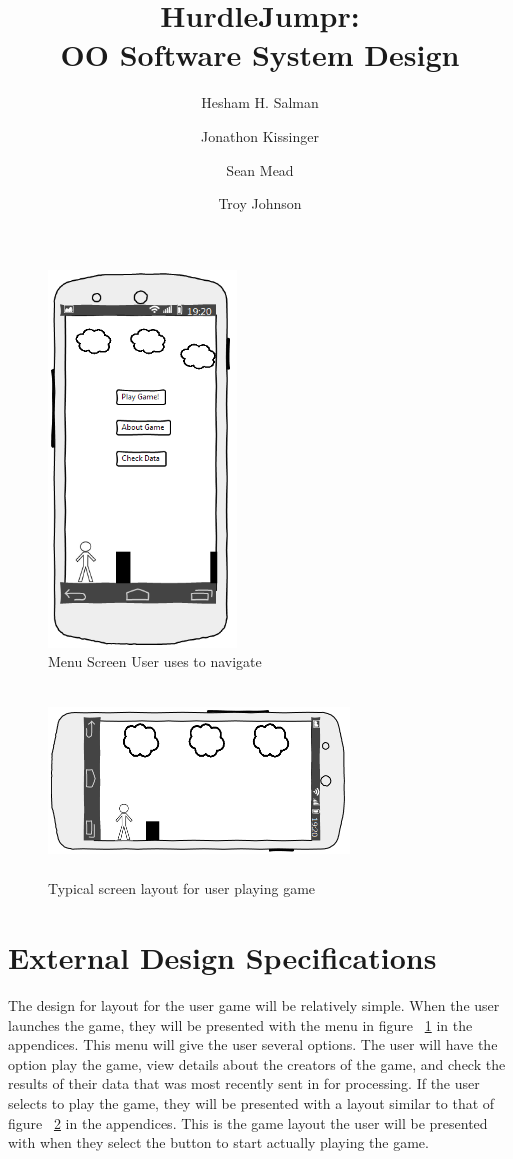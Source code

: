 \documentclass[a4wide]{article}
\title{HurdleJumpr:\\ OO Software System Design}
\author{Hesham H. Salman \and Jonathon Kissinger \and Sean Mead \and Troy Johnson}
\begin{document}
\maketitle

\begin{figure}[H]
\centering
\includegraphics[height=10cm, width = 5cm]{images/intro.png}
\caption{Menu Screen User uses to navigate}
\label{fig:intro_image}
\end{figure}

\begin{figure}[H]
\centering
\includegraphics[height=5cm, width = 8cm]{images/screen_layout.png}
\caption{Typical screen layout for user playing game}
\label{fig:screen_layout}
\end{figure}

\section{External Design Specifications}
The design for layout for the user game will be relatively simple. When the user launches the game, they will be presented with the menu in figure ~\ref{fig:intro_image} in the appendices. This menu will give the user several options. The user will have the option play the game, view details about the creators of the game, and check the results of their data that was most recently sent in for processing. If the user selects to play the game, they will be presented with a layout similar to that of figure ~\ref{fig:screen_layout} in the appendices. This is the game layout the user will be presented with when they select the button to start actually playing the game.
\end{document}
